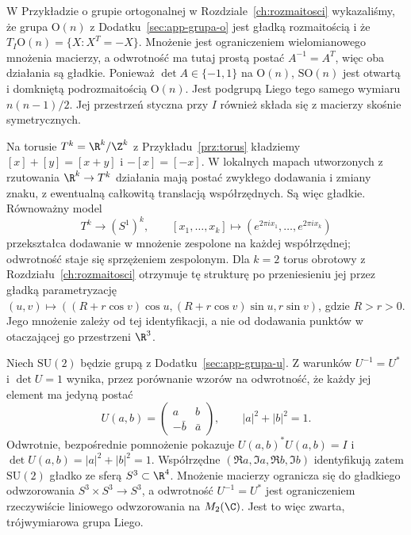 \begin{przyklad}
\label{prz:orth-liego}
W Przykładzie o grupie ortogonalnej w
Rozdziale~\ref{ch:rozmaitosci} wykazaliśmy, że
grupa $\mathrm O(n)$ z Dodatku~\ref{sec:app-grupa-o}
jest gładką rozmaitością i że
$T_I\mathrm O(n)=\{X:X^T=-X\}$. Mnożenie jest ograniczeniem
wielomianowego mnożenia macierzy, a odwrotność ma tutaj prostą
postać $A^{-1}=A^T$, więc oba działania są gładkie.
Ponieważ $\det A\in\{-1,1\}$ na $\mathrm O(n)$,
$\mathrm{SO}(n)$ jest
otwartą i domkniętą podrozmaitością $\mathrm O(n)$.
Jest podgrupą Liego tego samego wymiaru $n(n-1)/2$.
Jej przestrzeń styczna przy $I$ również składa się z
macierzy skośnie symetrycznych.
\end{przyklad}

\begin{przyklad}
\label{prz:torus-liego}
Na torusie $T^k=\R^k/\Z^k$ z Przykładu~\ref{prz:torus}
kładziemy $[x]+[y]=[x+y]$ i $-[x]=[-x]$. W lokalnych mapach
utworzonych z rzutowania $\R^k\to T^k$ działania mają postać
zwykłego dodawania i zmiany znaku, z ewentualną całkowitą
translacją współrzędnych. Są więc gładkie. Równoważny model
\[
 T^k\longrightarrow(S^1)^k,\qquad
 [x_1,\ldots,x_k]\longmapsto
 (e^{2\pi i x_1},\ldots,e^{2\pi i x_k})
\]
przekształca dodawanie w mnożenie zespolone na każdej współrzędnej;
odwrotność staje się sprzężeniem zespolonym. Dla $k=2$ torus
obrotowy z Rozdziału~\ref{ch:rozmaitosci} otrzymuje tę strukturę
po przeniesieniu jej przez gładką parametryzację
$(u,v)\mapsto((R+r\cos v)\cos u,(R+r\cos v)\sin u,r\sin v)$,
gdzie $R>r>0$. Jego mnożenie zależy od tej identyfikacji, a nie
od dodawania punktów w otaczającej go przestrzeni $\R^3$.
\end{przyklad}

\begin{przyklad}
\label{prz:su2-liego}
Niech $\mathrm{SU}(2)$ będzie grupą z
Dodatku~\ref{sec:app-grupa-u}.
Z warunków $U^{-1}=U^*$ i $\det U=1$ wynika, przez porównanie
wzorów na odwrotność, że każdy jej element ma jedyną postać
\begin{equation}\label{eq:su2-macierz}
 U(a,b)=\begin{pmatrix}a&b\\-\bar b&\bar a\end{pmatrix},
 \qquad |a|^2+|b|^2=1.
\end{equation}
Odwrotnie, bezpośrednie pomnożenie pokazuje
$U(a,b)^*U(a,b)=I$ i $\det U(a,b)=|a|^2+|b|^2=1$.
Współrzędne $(\Re a,\Im a,\Re b,\Im b)$ identyfikują zatem
$\mathrm{SU}(2)$ gładko ze sferą $S^3\subset\R^4$.
Mnożenie macierzy ogranicza się do gładkiego odwzorowania
$S^3\times S^3\to S^3$, a odwrotność $U^{-1}=U^*$ jest
ograniczeniem rzeczywiście liniowego odwzorowania na $M_2(\C)$.
Jest to więc zwarta, trójwymiarowa grupa Liego.
\end{przyklad}

